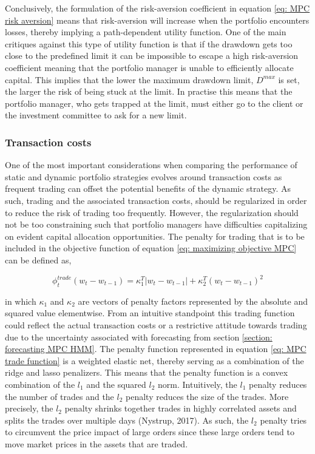 Conclusively, the formulation of the risk-aversion coefficient in equation \ref{eq: MPC risk aversion} means that risk-aversion will increase when the portfolio encounters losses, thereby implying a path-dependent utility function. One of the main critiques against this type of utility function is that if the drawdown gets too close to the predefined limit it can be impossible to escape a high risk-aversion coefficient meaning that the portfolio manager is unable to efficiently allocate capital. This implies that the lower the maximum drawdown limit, $D^{max}$ is set, the larger the risk of being stuck at the limit. In practise this means that the portfolio manager, who gets trapped at the limit, must either go to the client or the investment committee to ask for a new limit.

\subsubsection{Transaction costs}
One of the most important considerations when comparing the performance of static and dynamic portfolio strategies evolves around transaction costs as frequent trading can offset the potential benefits of the dynamic strategy. As such, trading and the associated transaction costs, should be regularized in order to reduce the risk of trading too frequently. However, the regularization should not be too constraining such that portfolio managers have difficulties capitalizing on evident capital allocation opportunities. The penalty for trading that is to be included in the objective function of equation \ref{eq: maximizing objective MPC} can be defined as, 

\begin{equation}
    \phi_t^{trade}(w_t-w_{t-1}) = \kappa_1^T|w_t-w_{t-1}| + \kappa_2^T(w_t-w_{t-1})^2
    \label{eq: MPC trade function}
\end{equation}

in which $\kappa_1$ and $\kappa_2$ are vectors of penalty factors represented by the absolute and squared value elementwise. From an intuitive standpoint this trading function could reflect the actual transaction costs or a restrictive attitude towards trading due to the uncertainty associated with forecasting from section \ref{section: forecasting MPC HMM}. The penalty function represented in equation \ref{eq: MPC trade function} is a weighted elastic net, thereby serving as a combination of the ridge and lasso penalizers. This means that the penalty function is a convex combination of the $l_1$ and the squared $l_2$ norm. Intuitively, the $l_1$ penalty reduces the number of trades and the $l_2$ penalty reduces the size of the trades. More precisely, the $l_2$ penalty shrinks together trades in highly correlated assets and splits the trades over multiple days (Nystrup, 2017). As such, the $l_2$ penalty tries to circumvent the price impact of large orders since these large orders tend to move market prices in the assets that are traded. 

